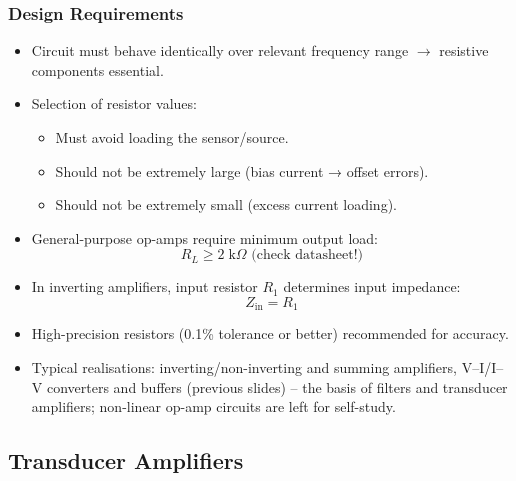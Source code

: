 \begin{frame}
	\frametitle{Design Requirements}
	\small
	\begin{itemize}
		\item Circuit must behave identically over relevant frequency range $\rightarrow$ resistive components essential.
		\item Selection of resistor values:
		\begin{itemize}
			\item Must avoid loading the sensor/source.
			\item Should not be extremely large (bias current → offset errors).
			\item Should not be extremely small (excess current loading).
		\end{itemize}
		\item General-purpose op-amps require minimum output load:
		\begin{equation}
			R_L \geq 2\;\text{k}\Omega \text{ (check datasheet!)}
		\end{equation}
		\item In inverting amplifiers, input resistor $R_1$ determines input impedance:
		\begin{equation}
			Z_{\text{in}} = R_1
		\end{equation}
		\item High-precision resistors (0.1\% tolerance or better) recommended for accuracy.
		\item Typical realisations: inverting/non-inverting and summing amplifiers, V--I/I--V converters and buffers (previous slides) -- the basis of filters and transducer amplifiers; non-linear op-amp circuits are left for self-study.
	\end{itemize}
\end{frame}

\subsection{Transducer Amplifiers}

